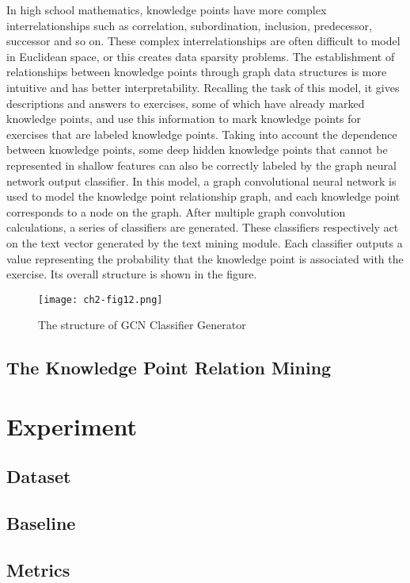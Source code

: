 In high school mathematics, knowledge points have more complex interrelationships such as correlation, subordination, inclusion, predecessor, successor and so on. These complex interrelationships are often difficult to model in Euclidean space, or this creates data sparsity problems. The establishment of relationships between knowledge points through graph data structures is more intuitive and has better interpretability. Recalling the task of this model, it gives descriptions and answers to exercises, some of which have already marked knowledge points, and use this information to mark knowledge points for exercises that are labeled knowledge points. Taking into account the dependence between knowledge points, some deep hidden knowledge points that cannot be represented in shallow features can also be correctly labeled by the graph neural network output classifier. In this model, a graph convolutional neural network is used to model the knowledge point relationship graph, and each knowledge point corresponds to a node on the graph. After multiple graph convolution calculations, a series of classifiers are generated. These classifiers respectively act on the text vector generated by the text mining module. Each classifier outputs a value representing the probability that the knowledge point is associated with the exercise. Its overall structure is shown in the figure.

\begin{figure}[h]
	\centering
	\texttt{[image: ch2-fig12.png]}
	\caption{The structure of GCN Classifier Generator}
	\label{ch2-fig12}
\end{figure}
\subsection{The Knowledge Point Relation Mining}

\section{Experiment}

\subsection{Dataset}

\subsection{Baseline}

\subsection{Metrics}

